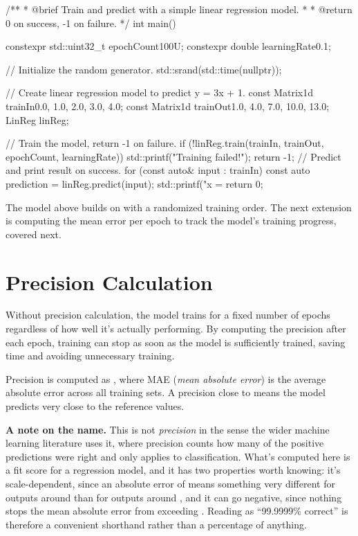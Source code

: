 \begin{cppcode}
/**
 * @brief Train and predict with a simple linear regression model.
 *
 * @return 0 on success, -1 on failure.
 */
int main()
{
    constexpr std::uint32_t epochCount{100U};
    constexpr double learningRate{0.1};

    // Initialize the random generator.
    std::srand(std::time(nullptr));

    // Create linear regression model to predict y = 3x + 1.
    const Matrix1d trainIn{0.0, 1.0, 2.0, 3.0, 4.0};
    const Matrix1d trainOut{1.0, 4.0, 7.0, 10.0, 13.0};
    LinReg linReg{};

    // Train the model, return -1 on failure.
    if (!linReg.train(trainIn, trainOut, epochCount, learningRate))
    {
        std::printf("Training failed!\n");
        return -1;
    }
    // Predict and print result on success.
    for (const auto& input : trainIn)
    {
        const auto prediction = linReg.predict(input);
        std::printf("x = %
    }
    return 0;
}
\end{cppcode}

The model above builds on  with a randomized training order. The next extension
is computing the mean error per epoch to track the model's training progress, covered next.

\section{Precision Calculation}
\label{c2:sec:precision}
Without precision calculation, the model trains for a fixed number of epochs regardless of how well
it's actually performing. By computing the precision after each epoch, training can stop as soon as
the model is sufficiently trained, saving time and avoiding unnecessary training.

Precision is computed as , where MAE (\emph{mean absolute error}) is the average
absolute error across all training sets. A precision close to  means the model predicts
very close to the reference values.

\textbf{A note on the name.} This is not \emph{precision} in the sense the wider machine learning
literature uses it, where precision counts how many of the positive predictions were right and only
applies to classification. What's computed here is a fit score for a regression model, and it has
two properties worth knowing: it's scale-dependent, since an absolute error of  means
something very different for outputs around  than for outputs around , and it can
go negative, since nothing stops the mean absolute error from exceeding . Reading
 as ``99.9999\% correct'' is therefore a convenient shorthand rather than a
percentage of anything.

